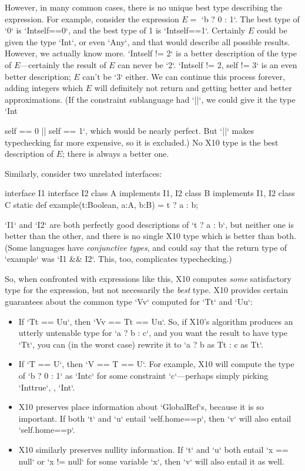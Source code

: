 However, in many common cases, there is no unique best type describing the
expression.  For example, consider the expression {$E=$} \xcd`b ? 0 : 1`.  The
best type of \xcd`0` 
is \xcd`Int{self==0}`, and the best type of 1 is \xcd`Int{self==1}`.
Certainly {$E$} could be given the type \xcd`Int`, or even \xcd`Any`, and that
would describe all possible results.  However, we actually know more.
\xcd`Int{self != 2}` is a better description of the type of {$E$}---certainly
the result of {$E$} can never be \xcd`2`.   \xcd`Int{self != 2, self != 3}` is
an even better description; {$E$} can't be \xcd`3` either.  We can continue
this process forever, adding integers which {$E$} will definitely not return
and getting better and better approximations. (If the constraint
sublanguage had \xcd`||`, we could give it the type 
\xcd`Int{self == 0 || self == 1`, which would be nearly perfect.  But 
\xcd`||` makes typechecking far more expensive, so it is excluded.)
No X10 type is the best description of {$E$}; there is always a better one.

Similarly, consider two unrelated interfaces: 
\begin{xten}
interface I1 {}
interface I2 {}
class A implements I1, I2 {}
class B implements I1, I2 {}
class C {
  static def example(t:Boolean, a:A, b:B) = t ? a : b;
}
\end{xten}
%
\xcd`I1` and \xcd`I2` are both perfectly good descriptions of \xcd`t ? a : b`, 
but neither one is better than the other, and there is no single X10 type
which is better than both. (Some languages have {\em conjunctive
    types}, and could say that the return type of \xcd`example` was 
\xcd`I1 && I2`.  This, too, complicates typechecking.)


So, when confronted with expressions like this, X10 computes {\em some}
satisfactory type for the expression, but not necessarily the {\em best} type.  
X10 provides certain guarantees about the common type \xcd`V{v}` computed for 
\xcd`T{t}` and \xcd`U{u}`: 
\begin{itemize}
\item If \xcd`T{t} == U{u}`, then \xcd`V{v} == T{t} == U{u}`.  So, if X10's
      algorithm produces an utterly untenable type for \xcd`a ? b : c`, and
      you want the result to have type \xcd`T{t}`, you can 
      (in the worst case) rewrite it to 
      \xcd`a ? b as T{t} : c as T{t}`.
\item If \xcd`T == U`, then \xcd`V == T == U`.  For example, 
      X10 will compute the type of \xcd`b ? 0 : 1` as 
      \xcd`Int{c}` for some constraint \xcd`c`---perhaps simply 
      picking \xcd`Int{true}`, \viz, \xcd`Int`. 
\item X10 preserves place information about \xcd`GlobalRef`s, because it is so important. If both
      \xcd`t` and \xcd`u` entail \xcd`self.home==p`, then  
      \xcd`v` will also entail \xcd`self.home==p`.  
\item X10 similarly preserves nullity information.  If \xcd`t` and \xcd`u`
      both entail \xcd`x == null` or \xcd`x != null` for some variable
      \xcd`x`, then \xcd`v` will also entail it as well.


\end{itemize}}
